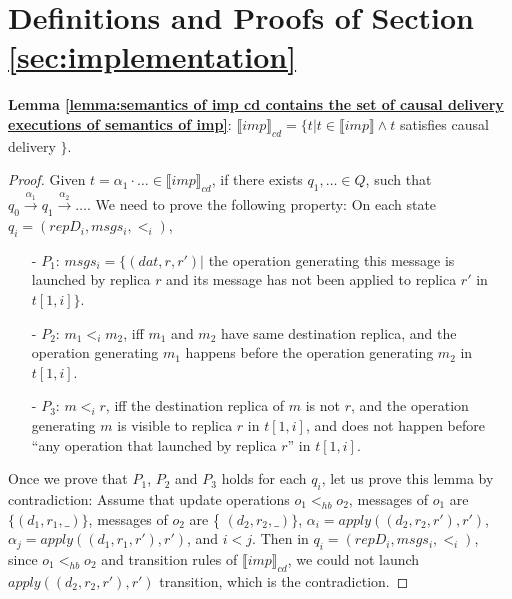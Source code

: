 \section{Definitions and Proofs of Section \ref{sec:implementation}}
\label{sec:appendix definitions and proofs of section implementation}



{\noindent \bf Lemma \ref{lemma:semantics of imp cd contains the set of causal delivery executions of semantics of imp}}: $\llbracket imp \rrbracket_{cd} = \{ t \vert t \in \llbracket imp \rrbracket \wedge t$ satisfies causal delivery $\}$.

\begin {proof}

Given $t = \alpha_1 \cdot \ldots \in \llbracket imp \rrbracket_{cd}$, if there exists $q_1,\ldots \in Q$, such that $q_0 {\xrightarrow{\alpha_1}} q_1 {\xrightarrow{\alpha_2}} \ldots$. We need to prove the following property: On each state $q_i=(repD_i,msgs_i,<_i)$,

\begin{itemize}
\setlength{\itemsep}{0.5pt}
\item[-] $P_1$: $msgs_i = \{ (dat,r,r') \vert$ the operation generating this message is launched by replica $r$ and its message has not been applied to replica $r'$ in $t[1,i]\}$.

\item[-] $P_2$: $m_1 <_i m_2$, iff $m_1$ and $m_2$ have same destination replica, and the operation generating $m_1$ happens before the operation generating $m_2$ in $t[1,i]$.

\item[-] $P_3$: $m <_i r$, iff the destination replica of $m$ is not $r$, and the operation generating $m$ is visible to replica $r$ in $t[1,i]$, and does not happen before ``any operation that launched by replica $r$'' in $t[1,i]$.
\end{itemize}

Once we prove that $P_1$, $P_2$ and $P_3$ holds for each $q_i$, let us prove this lemma by contradiction: Assume that update operations $o_1 <_{hb} o_2$, messages of $o_1$ are $\{ (d_1,r_1,\_) \}$, messages of $o_2$ are \{ $(d_2,r_2,\_) \}$, $\alpha_i = apply((d_2,r_2,r'),r')$, $\alpha_j = apply((d_1,r_1,r'),r')$, and $i<j$. Then in $q_i=(repD_i,msgs_i,<_i)$, since $o_1 <_{hb} o_2$ and transition rules of $\llbracket imp \rrbracket_{cd}$, we could not launch $apply((d_2,r_2,r'),r')$ transition, which is the contradiction.




\end{proof}
